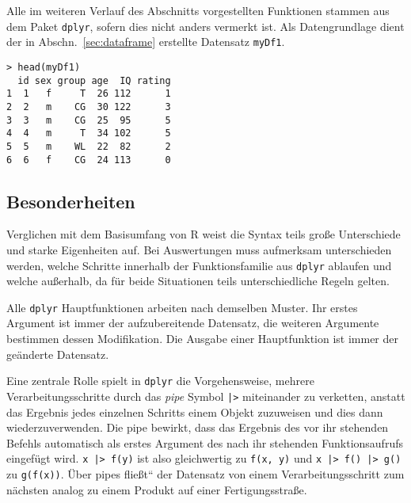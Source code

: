 Alle im weiteren Verlauf des Abschnitts vorgestellten Funktionen stammen aus dem Paket \lstinline!dplyr!, sofern dies nicht anders vermerkt ist. Als Datengrundlage dient der in Abschn.\ \ref{sec:dataframe} erstellte Datensatz \lstinline!myDf1!.
\begin{lstlisting}
> head(myDf1)
  id sex group age  IQ rating
1  1   f     T  26 112      1
2  2   m    CG  30 122      3
3  3   m    CG  25  95      5
4  4   m     T  34 102      5
5  5   m    WL  22  82      2
6  6   f    CG  24 113      0
\end{lstlisting}

\subsection{Besonderheiten}
\label{sec:dplyr_special}

Verglichen mit dem Basisumfang von R weist die Syntax teils große Unterschiede und starke Eigenheiten auf. Bei Auswertungen muss aufmerksam unterschieden werden, welche Schritte innerhalb der Funktionsfamilie aus \lstinline!dplyr! ablaufen und welche außerhalb, da für beide Situationen teils unterschiedliche Regeln gelten.

Alle \lstinline!dplyr! Hauptfunktionen arbeiten nach demselben Muster. Ihr erstes Argument ist immer der aufzubereitende Datensatz, die weiteren Argumente bestimmen dessen Modifikation. Die Ausgabe einer Hauptfunktion ist immer der geänderte Datensatz.

Eine zentrale Rolle spielt in \lstinline!dplyr! die Vorgehensweise, mehrere Verarbeitungsschritte durch das \emph{pipe} Symbol \lstinline!|>! miteinander zu verketten, anstatt das Ergebnis jedes einzelnen Schritts einem Objekt zuzuweisen und dies dann wiederzuverwenden. Die pipe bewirkt, dass das Ergebnis des vor ihr stehenden Befehls automatisch als erstes Argument des nach ihr stehenden Funktionsaufrufs eingefügt wird. \lstinline!x |> f(y)! ist also gleichwertig zu \lstinline!f(x, y)! und \lstinline!x |> f() |> g()! zu \lstinline!g(f(x))!. Über pipes {\quotedblbase}fließt{\textquotedblleft} der Datensatz von einem Verarbeitungsschritt zum nächsten analog zu einem Produkt auf einer Fertigungsstraße.

